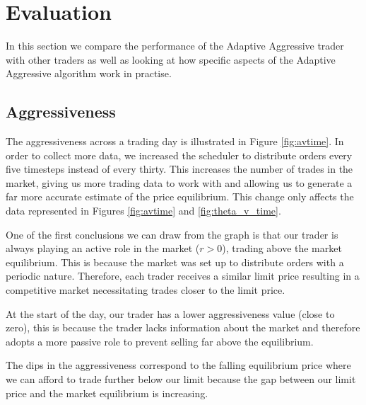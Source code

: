 \documentclass[preprint]{acm_proc_article-sp} %
\begin{document}
\section{Evaluation} \label{sec:evaluation}
In this section we compare the performance of the Adaptive Aggressive trader
with other traders as well as looking at how specific aspects of the Adaptive
Aggressive algorithm work in practise.\\


\subsection{Aggressiveness} \label{sec:evaluation_aggressiveness} 
The aggressiveness across a trading day is illustrated in Figure \ref{fig:avtime}.
In order to collect more data, we
increased the scheduler to distribute orders every five timesteps instead of
every thirty. This increases the number of trades in the market, giving us more
trading data to work with and allowing us to generate a far more accurate
estimate of the price equilibrium. This change only affects the data
represented in Figures \ref{fig:avtime} and \ref{fig:theta_v_time}.

One of the first conclusions we can draw from the graph is that our trader is
always playing an active role in the market ($r > 0$), trading above the market
equilibrium. This is because the market was set up to distribute orders with a
periodic nature. Therefore, each trader receives a similar limit price
resulting in a competitive market necessitating trades closer to the limit
price. 

At the start of the day, our trader has a lower aggressiveness value (close to
zero), this is because the trader lacks information about the market and
therefore adopts a more passive role to prevent selling far above the
equilibrium.

The dips in the aggressiveness correspond to the falling equilibrium price
where we can afford to trade further below our limit because the gap between
our limit price and the market equilibrium is increasing.
\end{document}
